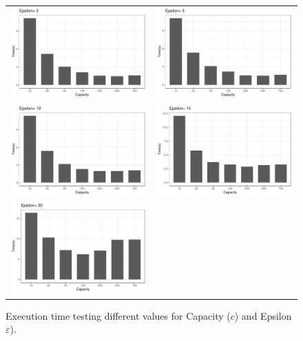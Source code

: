 \begin{figure}
    \centering
    \begin{tabular}{c c}
         \includegraphics[width=0.45\linewidth]{figures/plots/01_optimal_performance/pflockE2_by_capacity.pdf} & 
         \includegraphics[width=0.45\linewidth]{figures/plots/01_optimal_performance/pflockE5_by_capacity.pdf} \\
         \includegraphics[width=0.45\linewidth]{figures/plots/01_optimal_performance/pflockE10_by_capacity.pdf} &
         \includegraphics[width=0.45\linewidth]{figures/plots/01_optimal_performance/pflockE15_by_capacity.pdf} \\ 
         \includegraphics[width=0.45\linewidth]{figures/plots/01_optimal_performance/pflockE20_by_capacity.pdf} & \\
    \end{tabular}
    \caption{Execution time testing different values for Capacity ($c$) and Epsilon  $\varepsilon$).}\label{fig:optimal_performance}
\end{figure}

